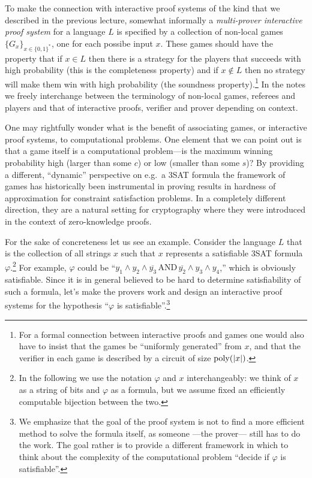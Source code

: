 \begin{remark}
To make the connection with interactive proof systems of the kind that we described in the previous lecture, somewhat informally a \emph{multi-prover interactive proof system} for a language $L$ is specified by a collection of non-local games $\{G_x\}_{x\in\{0,1\}^*}$, one for each possibe input $x$. These games should have the property that if $x\in L$ then there is a strategy for the players that succeeds with high probability (this is the completeness property) and if $x\notin L$ then no strategy will make them win with high probability (the soundness property).\footnote{For a formal connection between interactive proofs and games one would also have to insist that the games be ``uniformly generated'' from $x$, and that the verifier in each game is described by a circuit of size $\operatorname{poly}(|x|)$.} In the notes we freely interchange between the terminology of non-local games, referees and players and that of interactive proofs, verifier and prover depending on context. 

One may rightfully wonder what is the benefit of associating games, or interactive proof systems, to computational problems. One element that we can point out is that a game itself is a computational problem---is the maximum winning probability high (larger than some $c$) or low (smaller than some $s$)? By providing a different, ``dynamic'' perspective on e.g.\ a $3$SAT formula the framework of games has historically been instrumental in proving results in hardness of approximation for constraint satisfaction problems. In a completely different direction, they are a natural setting for cryptography where they were introduced in the context of zero-knowledge proofs. 
\end{remark}

For the sake of concreteness let us see an example. Consider the language $L$ that is the collection of all strings $x$ such that $x$ represents a satisfiable $3$SAT formula  $\varphi$.\footnote{In the following we use the notation $\varphi$ and $x$ interchangeably: we think of $x$ as a string of bits and $\varphi$ as a formula, but we assume fixed an efficiently computable bijection between the two.} For example, $\varphi$ could be ``$y_1\wedge y_2\wedge \overline{  y_3}\,\text{AND}\, \overline{y_2}\wedge  y_3 \wedge y_4$,'' which is obviously satisfiable. Since it is in general believed to be hard to determine satisfiability of such a formula, let's make the provers work and design an interactive proof systems for the hypothesis ``$\varphi$ is satisfiable''.\footnote{We emphasize that the goal of the proof system is not to find a more efficient method to solve the formula itself, as someone ---the prover--- still has to do the work. The goal rather is to provide a different framework in which to think about the complexity of the computational problem ``decide if $\varphi$ is satisfiable''.}

